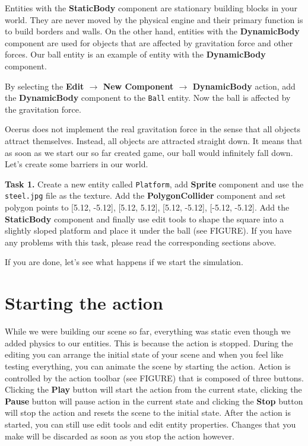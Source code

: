 \documentclass[a4paper,12pt]{article}
\begin{document}
Entities with the \textbf{StaticBody} component are stationary building blocks in your world. They are never moved by the physical engine and their primary function is to build borders and walls. On the other hand, entities with the \textbf{DynamicBody} component are used for objects that are affected by gravitation force and other forces. Our ball entity is an example of entity with the \textbf{DynamicBody} component.

By selecting the \textbf{Edit $\to$ New Component $\to$ DynamicBody} action, add the \textbf{DynamicBody} component to the \texttt{Ball} entity. Now the ball is affected by the gravitation force.

Ocerus does not implement the real gravitation force in the sense that all objects attract themselves. Instead, all objects are attracted straight down. It means that as soon as we start our so far created game, our ball would infinitely fall down. Let's create some barriers in our world.

\textbf{Task 1.} Create a new entity called \texttt{Platform}, add \textbf{Sprite} component and use the \texttt{steel.jpg} file as the texture. Add the \textbf{PolygonCollider} component and set polygon points to [5.12, -5.12], [5.12, 5.12], [5.12, -5.12], [-5.12, -5.12]. Add the \textbf{StaticBody} component and finally use edit tools to shape the square into a slightly sloped platform and place it under the ball (see FIGURE). If you have any problems with this task, please read the corresponding sections above.

If you are done, let's see what happens if we start the simulation.

\section{Starting the action}
While we were building our scene so far, everything was static even though we added physics to our entities. This is because the action is stopped. During the editing you can arrange the initial state of your scene and when you feel like testing everything, you can animate the scene by starting the action. Action is controlled by the action toolbar (see FIGURE) that is composed of three buttons. Clicking the \textbf{Play} button will start the action from the current state, clicking the \textbf{Pause} button will pause action in the current state and clicking the \textbf{Stop} button will stop the action and resets the scene to the initial state. After the action is started, you can still use edit tools and edit entity properties. Changes that you make will be discarded as soon as you stop the action however.
\end{document}
